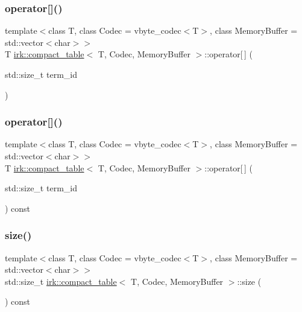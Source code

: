 \subsubsection{\texorpdfstring{operator[]()}{operator[]()}\hspace{0.1cm}{\footnotesize\ttfamily [1/2]}}
{\footnotesize\ttfamily template$<$class T, class Codec = vbyte\+\_\+codec$<$\+T$>$, class Memory\+Buffer = std\+::vector$<$char$>$$>$ \\
T \mbox{\hyperlink{classirk_1_1compact__table}{irk\+::compact\+\_\+table}}$<$ T, Codec, Memory\+Buffer $>$\+::operator\mbox{[}$\,$\mbox{]} (\begin{DoxyParamCaption}\item[{std\+::size\+\_\+t}]{term\+\_\+id }\end{DoxyParamCaption})\hspace{0.3cm}{\ttfamily [inline]}}

\mbox{\label{classirk_1_1compact__table_a9ecc7e062cbf50ef02db7740c166fb94}} 
\subsubsection{\texorpdfstring{operator[]()}{operator[]()}\hspace{0.1cm}{\footnotesize\ttfamily [2/2]}}
{\footnotesize\ttfamily template$<$class T, class Codec = vbyte\+\_\+codec$<$\+T$>$, class Memory\+Buffer = std\+::vector$<$char$>$$>$ \\
T \mbox{\hyperlink{classirk_1_1compact__table}{irk\+::compact\+\_\+table}}$<$ T, Codec, Memory\+Buffer $>$\+::operator\mbox{[}$\,$\mbox{]} (\begin{DoxyParamCaption}\item[{std\+::size\+\_\+t}]{term\+\_\+id }\end{DoxyParamCaption}) const\hspace{0.3cm}{\ttfamily [inline]}}

\mbox{\label{classirk_1_1compact__table_a868e5c254b459b6ab831681d5e9f34c1}} 
\subsubsection{\texorpdfstring{size()}{size()}}
{\footnotesize\ttfamily template$<$class T, class Codec = vbyte\+\_\+codec$<$\+T$>$, class Memory\+Buffer = std\+::vector$<$char$>$$>$ \\
std\+::size\+\_\+t \mbox{\hyperlink{classirk_1_1compact__table}{irk\+::compact\+\_\+table}}$<$ T, Codec, Memory\+Buffer $>$\+::size (\begin{DoxyParamCaption}{ }\end{DoxyParamCaption}) const\hspace{0.3cm}{\ttfamily [inline]}}



